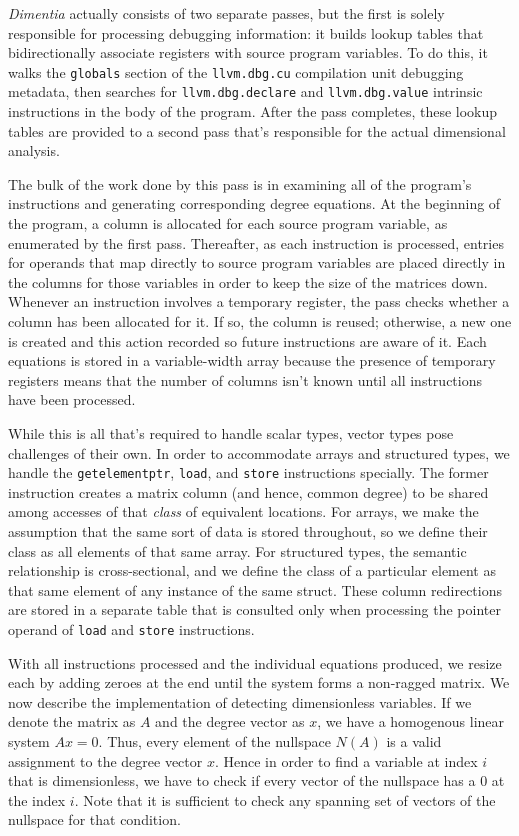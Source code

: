 \documentclass[12pt]{article}
\begin{document}
\textit{Dimentia} actually consists of two separate passes, but the first is solely responsible for processing debugging information: it builds lookup tables that bidirectionally associate registers with source program variables.
To do this, it walks the \texttt{globals} section of the \texttt{llvm.dbg.cu} compilation unit debugging metadata, then searches for \texttt{llvm.dbg.declare} and \texttt{llvm.dbg.value} intrinsic instructions in the body of the program.
After the pass completes, these lookup tables are provided to a second pass that's responsible for the actual dimensional analysis.

The bulk of the work done by this pass is in examining all of the program's instructions and generating corresponding degree equations.
At the beginning of the program, a column is allocated for each source program variable, as enumerated by the first pass.
Thereafter, as each instruction is processed, entries for operands that map directly to source program variables are placed directly in the columns for those variables in order to keep the size of the matrices down.
Whenever an instruction involves a temporary register, the pass checks whether a column has been allocated for it.
If so, the column is reused; otherwise, a new one is created and this action recorded so future instructions are aware of it.
Each equations is stored in a variable-width array because the presence of temporary registers means that the number of columns isn't known until all instructions have been processed.

While this is all that's required to handle scalar types, vector types pose challenges of their own.
In order to accommodate arrays and structured types, we handle the \texttt{getelementptr}, \texttt{load}, and \texttt{store} instructions specially.
The former instruction creates a matrix column (and hence, common degree) to be shared among accesses of that \textit{class} of equivalent locations.
For arrays, we make the assumption that the same sort of data is stored throughout, so we define their class as all elements of that same array.
For structured types, the semantic relationship is cross-sectional, and we define the class of a particular element as that same element of any instance of the same struct.
These column redirections are stored in a separate table that is consulted only when processing the pointer operand of \texttt{load} and \texttt{store} instructions.

With all instructions processed and the individual equations produced, we resize each by adding zeroes at the end until the system forms a non-ragged matrix. We now describe the implementation of detecting dimensionless variables. If we denote the matrix as $A$ and the degree vector as $x$, we have a homogenous linear system $Ax = 0$. Thus, every element of the nullspace $N(A)$ is a valid assignment to the degree vector $x$. Hence in order to find a variable at index $i$ that is dimensionless, we have to check if every vector of the nullspace has a $0$ at the index $i$. Note that it is sufficient to check any spanning set of vectors of the nullspace for that condition.
\end{document}
